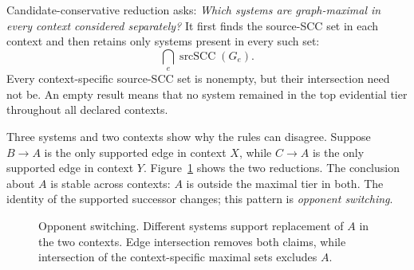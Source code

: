 \documentclass[11pt]{article}
\theoremstyle{remark}
\begin{document}
Candidate-conservative reduction asks: \emph{Which systems are graph-maximal
in every context considered separately?} It first finds the source-SCC set in
each context and then retains only systems present in every such set:
\begin{equation}
\bigcap_e \operatorname{srcSCC}(G_e).
\label{eq:candidate-conservative}
\end{equation}
Every context-specific source-SCC set is nonempty, but their intersection need
not be. An empty result means that no system remained in the top evidential
tier throughout all declared contexts.

Three systems and two contexts show why the rules can disagree. Suppose
$B\to A$ is the only supported edge in context $X$, while $C\to A$ is the only
supported edge in context $Y$. Figure~\ref{fig:round-robin-opponent-switching}
shows the two reductions. The conclusion about $A$ is stable across contexts:
$A$ is outside the maximal tier in both. The identity of the supported
successor changes; this pattern is \emph{opponent switching}.

\begin{figure}[htbp]
\centering
{}
\caption{Opponent switching. Different systems support replacement of $A$ in
the two contexts. Edge intersection removes both claims, while intersection
of the context-specific maximal sets excludes $A$.}
\label{fig:round-robin-opponent-switching}
\end{figure}
\end{document}
